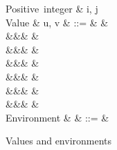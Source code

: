 \begin{figure}[H]
\begin{syntaxfig}
\mbox{Positive integer}
&
i, j
\\[2mm]
\mbox{Value}
&
u, v
&
::=
&
\exTrue \mid \exFalse
&
\\
&&&
&
\\
&&&
\exNil
&
\\
&&&
&
\\
&&&
&
\\
&&&
&
\\
&&&
&
\\[2mm]
\mbox{Environment}
&
\rho
&
::=
&
\end{syntaxfig}
\caption{Values and environments}
\label{fig:core-syntax-value}
\end{figure}

